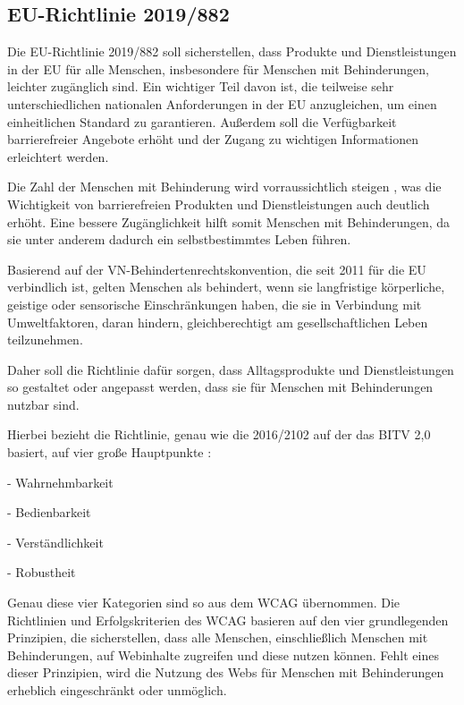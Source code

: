 \subsection{EU-Richtlinie 2019/882 }

Die EU-Richtlinie 2019/882 soll sicherstellen, dass Produkte und Dienstleistungen in der EU für alle Menschen, insbesondere für Menschen mit Behinderungen, leichter zugänglich sind. Ein wichtiger Teil davon ist, die teilweise sehr unterschiedlichen nationalen Anforderungen in der EU anzugleichen, um einen einheitlichen Standard zu garantieren. Außerdem soll die Verfügbarkeit barrierefreier Angebote erhöht und der Zugang zu wichtigen Informationen erleichtert werden. 

Die Zahl der Menschen mit Behinderung wird vorraussichtlich steigen \parencite[vgl.][]{eu_eur2019882erwaegungsgrund_2_2017}, was die Wichtigkeit von barrierefreien Produkten und Dienstleistungen auch deutlich erhöht. Eine bessere Zugänglichkeit hilft somit Menschen mit Behinderungen, da sie unter anderem dadurch ein selbstbestimmtes Leben führen. 

Basierend auf der VN-Behindertenrechtskonvention, die seit 2011 für die EU verbindlich ist, gelten Menschen als behindert, wenn sie langfristige körperliche, geistige oder sensorische Einschränkungen haben, die sie in Verbindung mit Umweltfaktoren, daran hindern, gleichberechtigt am gesellschaftlichen Leben teilzunehmen. 

Daher soll die Richtlinie dafür sorgen, dass Alltagsprodukte und Dienstleistungen so gestaltet oder angepasst werden, dass sie für Menschen mit Behinderungen nutzbar sind. \parencite[vgl.][]{eu_eur2019882erwaegungsgrund_3_2017}

Hierbei bezieht die Richtlinie, genau wie die 2016/2102 auf der das BITV 2,0 basiert, auf vier große Hauptpunkte \parencite[vgl.][]{eu_eur2019882Anforderungen_2017}:

- Wahrnehmbarkeit

- Bedienbarkeit

- Verständlichkeit

- Robustheit


Genau diese vier Kategorien sind so aus dem WCAG übernommen. Die Richtlinien und Erfolgskriterien des WCAG basieren auf den vier grundlegenden Prinzipien, die sicherstellen, dass alle Menschen, einschließlich Menschen mit Behinderungen, auf Webinhalte zugreifen und diese nutzen können. Fehlt eines dieser Prinzipien, wird die Nutzung des Webs für Menschen mit Behinderungen erheblich eingeschränkt oder unmöglich. \parencite{w3c_4principlesA11y_2024}

